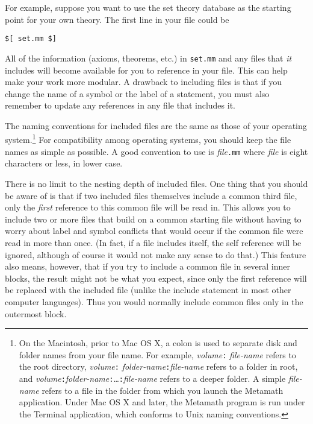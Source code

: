 For example, suppose you want to use the set theory database as the starting
point for your own theory.  The first line in your file could be
\begin{center}
\texttt{\$[ set.mm \$]}
\end{center} All of the information (axioms, theorems,
etc.) in \texttt{set.mm} and any files that {\em it} includes will become
available for you to reference in your file. This can help make your work more
modular. A drawback to including files is that if you change the name of a
symbol or the label of a statement, you must also remember to update any
references in any file that includes it.


The naming conventions for included files are the same as those of your
operating system.\footnote{On the Macintosh, prior to Mac OS X,
 a colon is used to separate disk
and folder names from your file name.  For example, {\em volume}\texttt{:}{\em
file-name} refers to the root directory, {\em volume}\texttt{:}{\em
folder-name}\texttt{:}{\em file-name} refers to a folder in root, and {\em
volume}\texttt{:}{\em folder-name}\texttt{:}\ldots\texttt{:}{\em file-name} refers to a
deeper folder.  A simple {\em file-name} refers to a file in the folder from
which you launch the Metamath application.  Under Mac OS X and later,
the Metamath program is run under the Terminal application, which
conforms to Unix naming conventions.}\label{includef} For compatibility among
operating systems, you should keep the file names as simple as possible.  A
good convention to use is {\em file}\texttt{.mm} where {\em file} is eight
characters or less, in lower case.

There is no limit to the nesting depth of included files.  One thing that you
should be aware of is that if two included files themselves include a common
third file, only the {\em first} reference to this common file will be read
in.  This allows you to include two or more files that build on a common
starting file without having to worry about label and symbol conflicts that
would occur if the common file were read in more than once.  (In fact, if a
file includes itself, the self reference will be ignored, although of course
it would not make any sense to do that.)  This feature also means, however,
that if you try to include a common file in several inner blocks, the result
might not be what you expect, since only the first reference will be replaced
with the included file (unlike the include statement in most other computer
languages).  Thus you would normally include common files only in the
outermost block.

